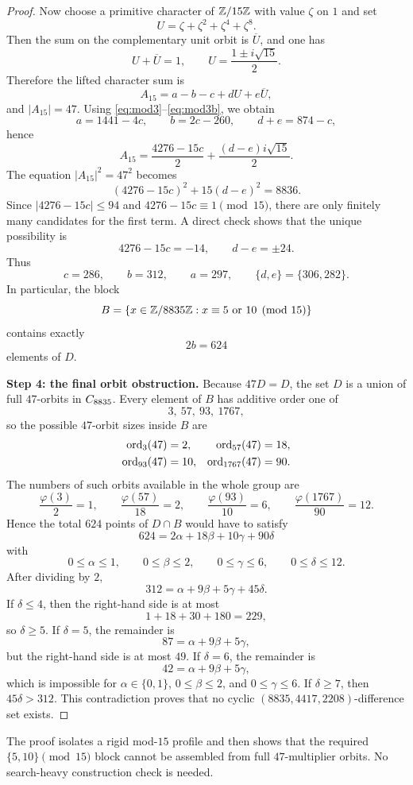 \documentclass[11pt]{amsart}
\begin{document}
\begin{proof}
Now choose a primitive character of $\mathbb{Z}/15\mathbb{Z}$ with value $\zeta$ on $1$ and set
\[
U=\zeta+\zeta^2+\zeta^4+\zeta^8.
\]
Then the sum on the complementary unit orbit is $\overline{U}$, and one has
\[
U+\overline{U}=1,\qquad U=\frac{1\pm i\sqrt{15}}{2}.
\]
Therefore the lifted character sum is
\[
A_{15}=a-b-c+dU+e\overline{U},
\]
and $|A_{15}|=47$.
Using \eqref{eq:mod3}--\eqref{eq:mod3b}, we obtain
\[
a=1441-4c,\qquad b=2c-260,\qquad d+e=874-c,
\]
hence
\[
A_{15}=\frac{4276-15c}{2}+\frac{(d-e)i\sqrt{15}}{2}.
\]
The equation $|A_{15}|^2=47^2$ becomes
\[
(4276-15c)^2+15(d-e)^2=8836.
\]
Since $|4276-15c|\le 94$ and $4276-15c\equiv 1\pmod{15}$, there are only finitely many candidates for the first term.
A direct check shows that the unique possibility is
\[
4276-15c=-14,\qquad d-e=\pm 24.
\]
Thus
\[
c=286,\qquad b=312,\qquad a=297,\qquad \{d,e\}=\{306,282\}.
\]
In particular, the block
\[
B=\{x\in \mathbb{Z}/8835\mathbb{Z}: x\equiv 5 \text{ or } 10 \pmod{15}\}
\]
contains exactly
\[
2b=624
\]
elements of $D$.

\medskip
\noindent\textbf{Step 4: the final orbit obstruction.}
Because $47D=D$, the set $D$ is a union of full $47$-orbits in $C_{8835}$.
Every element of $B$ has additive order one of
\[
3,\ 57,\ 93,\ 1767,
\]
so the possible $47$-orbit sizes inside $B$ are
\begin{align*}
\operatorname{ord}_3(47)&=2, & \operatorname{ord}_{57}(47)&=18,\\
\operatorname{ord}_{93}(47)&=10, & \operatorname{ord}_{1767}(47)&=90.
\end{align*}
The numbers of such orbits available in the whole group are
\[
\frac{\varphi(3)}{2}=1,\qquad
\frac{\varphi(57)}{18}=2,\qquad
\frac{\varphi(93)}{10}=6,\qquad
\frac{\varphi(1767)}{90}=12.
\]
Hence the total $624$ points of $D\cap B$ would have to satisfy
\[
624 = 2\alpha + 18\beta + 10\gamma + 90\delta
\]
with
\[
0\le \alpha\le 1,\qquad 0\le \beta\le 2,\qquad 0\le \gamma\le 6,\qquad 0\le \delta\le 12.
\]
After dividing by $2$,
\[
312=\alpha+9\beta+5\gamma+45\delta.
\]
If $\delta\le 4$, then the right-hand side is at most
\[
1+18+30+180=229,
\]
so $\delta\ge 5$.
If $\delta=5$, the remainder is
\[
87=\alpha+9\beta+5\gamma,
\]
but the right-hand side is at most $49$.
If $\delta=6$, the remainder is
\[
42=\alpha+9\beta+5\gamma,
\]
which is impossible for $\alpha\in\{0,1\}$, $0\le \beta\le 2$, and $0\le \gamma\le 6$.
If $\delta\ge 7$, then $45\delta>312$.
This contradiction proves that no cyclic $(8835,4417,2208)$-difference set exists.
\end{proof}

\begin{remark}
The proof isolates a rigid mod-$15$ profile and then shows that the required $\{5,10\}\pmod{15}$ block cannot be assembled from full $47$-multiplier orbits.
No search-heavy construction check is needed.
\end{remark}
\end{document}
